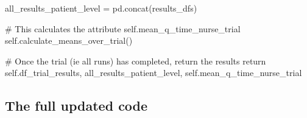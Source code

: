 \documentclass[
  letterpaper,
  DIV=11,
  numbers=noendperiod]{scrreprt}
\newenvironment{Shaded}{}{}
\newcommand{\CommentTok}[1]{\textcolor[rgb]{0.42,0.45,0.49}{#1}}
\newcommand{\ControlFlowTok}[1]{\textcolor[rgb]{0.84,0.23,0.29}{#1}}
\newcommand{\NormalTok}[1]{\textcolor[rgb]{0.14,0.16,0.18}{#1}}
\newcommand{\OperatorTok}[1]{\textcolor[rgb]{0.14,0.16,0.18}{#1}}
\newcommand{\VariableTok}[1]{\textcolor[rgb]{0.89,0.38,0.04}{#1}}
\begin{document}
\begin{Shaded}
\begin{Highlighting}[]
\NormalTok{    all\_results\_patient\_level }\OperatorTok{=}\NormalTok{ pd.concat(results\_dfs)}

    \CommentTok{\# This calculates the attribute self.mean\_q\_time\_nurse\_trial}
    \VariableTok{self}\NormalTok{.calculate\_means\_over\_trial()}

    \CommentTok{\# Once the trial (ie all runs) has completed, return the results}
    \ControlFlowTok{return} \VariableTok{self}\NormalTok{.df\_trial\_results, all\_results\_patient\_level, }\VariableTok{self}\NormalTok{.mean\_q\_time\_nurse\_trial}
\end{Highlighting}
\end{Shaded}

\subsection{The full updated code}\label{the-full-updated-code}
\end{document}
